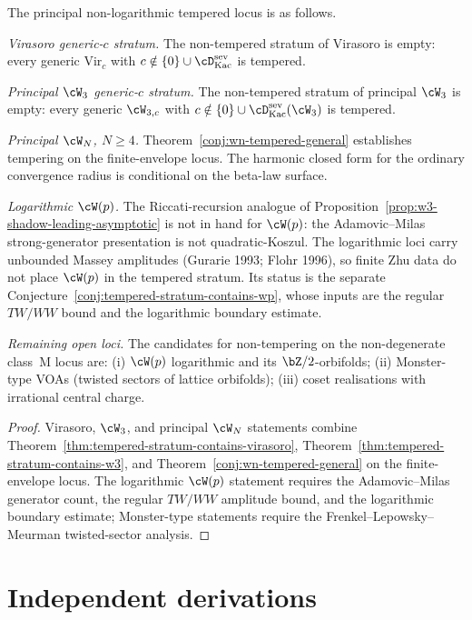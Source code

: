 \begin{corollary}
\label{cor:original-complex-dichotomy-healed}
The principal non-logarithmic tempered locus is as follows.

\emph{Virasoro generic-$c$ stratum.} The non-tempered stratum of
Virasoro is empty: every generic $\mathrm{Vir}_c$ with
$c \notin \{0\} \cup \cD^{\mathrm{sev}}_{\mathrm{Kac}}$ is tempered.

\emph{Principal $\cW_3$ generic-$c$ stratum.} The non-tempered stratum
of principal $\cW_3$ is empty: every generic
$\cW_{3, c}$ with $c \notin \{0\} \cup
\cD^{\mathrm{sev}}_{\mathrm{Kac}}(\cW_3)$ is tempered.

\emph{Principal $\cW_N$, $N \ge 4$.}
Theorem~\ref{conj:wn-tempered-general} establishes tempering on the
finite-envelope locus. The harmonic closed form for the ordinary
convergence radius is conditional on the beta-law surface.

\emph{Logarithmic $\cW(p)$.} The Riccati-recursion analogue of
Proposition~\ref{prop:w3-shadow-leading-asymptotic} is not in hand for
$\cW(p)$: the Adamovic--Milas strong-generator presentation is not
quadratic-Koszul. The logarithmic loci carry unbounded Massey
amplitudes (Gurarie 1993; Flohr 1996), so finite Zhu data do not place
$\cW(p)$ in the tempered stratum. Its status is the separate
Conjecture~\ref{conj:tempered-stratum-contains-wp}, whose inputs are
the regular $TW/WW$ bound and the logarithmic boundary estimate.

\emph{Remaining open loci.} The candidates for non-tempering on the
non-degenerate class~M locus are: (i) $\cW(p)$ logarithmic and its
$\bZ/2$-orbifolds; (ii) Monster-type VOAs (twisted sectors of
lattice orbifolds); (iii) coset realisations with irrational central
charge.
\end{corollary}

\begin{proof}
Virasoro, $\cW_3$, and principal $\cW_N$ statements combine
Theorem~\ref{thm:tempered-stratum-contains-virasoro},
Theorem~\ref{thm:tempered-stratum-contains-w3}, and
Theorem~\ref{conj:wn-tempered-general} on the finite-envelope locus.
The logarithmic $\cW(p)$ statement requires the Adamovic--Milas
generator count, the regular $TW/WW$ amplitude bound, and the
logarithmic boundary estimate; Monster-type statements require the
Frenkel--Lepowsky--Meurman twisted-sector analysis.
\end{proof}

\section{Independent derivations}
\label{sec:tempered-stratum-iv-summary}


